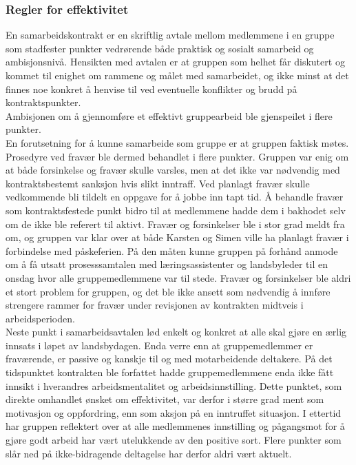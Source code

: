 \subsubsection{Regler for effektivitet}
En samarbeidskontrakt er en skriftlig avtale mellom medlemmene i en gruppe som stadfester punkter vedrørende både praktisk og sosialt samarbeid og ambisjonsnivå. 
Hensikten med avtalen er at gruppen som helhet får diskutert og kommet til enighet om rammene og målet med samarbeidet, og ikke minst at det finnes noe konkret å henvise til ved eventuelle konflikter og brudd på kontraktspunkter. 
\\
Ambisjonen om å gjennomføre et effektivt gruppearbeid ble gjenspeilet i flere punkter. 
\\
En forutsetning for å kunne samarbeide som gruppe er at gruppen faktisk møtes. 
Prosedyre ved fravær ble dermed behandlet i flere punkter. 
Gruppen var enig om at både forsinkelse og fravær skulle varsles, men at det ikke var nødvendig med kontraktsbestemt sanksjon hvis slikt inntraff. 
Ved planlagt fravær skulle vedkommende bli tildelt en oppgave for å jobbe inn tapt tid. 
Å behandle fravær som kontraktsfestede punkt bidro til at medlemmene hadde dem i bakhodet selv om de ikke ble referert til aktivt.
Fravær og forsinkelser ble i stor grad meldt fra om, og gruppen var klar over at både Karsten og Simen ville ha planlagt fravær i forbindelse med påskeferien. 
På den måten kunne gruppen på forhånd anmode om å få utsatt prosesssamtalen med læringsassistenter og landsbyleder til en onsdag hvor alle gruppemedlemmene var til stede.
Fravær og forsinkelser ble aldri et stort problem for gruppen, og det ble ikke ansett som nødvendig å innføre strengere rammer for fravær under revisjonen av kontrakten midtveis i arbeidsperioden. 
\\
Neste punkt i samarbeidsavtalen lød enkelt og konkret at alle skal gjøre en ærlig innsats i løpet av landsbydagen.
Enda verre enn at gruppemedlemmer er fraværende, er passive og kanskje til og med motarbeidende deltakere.
På det tidspunktet kontrakten ble forfattet hadde gruppemedlemmene enda ikke fått innsikt i hverandres arbeidsmentalitet og arbeidsinnstilling.
Dette punktet, som direkte omhandlet ønsket om effektivitet, var derfor i større grad ment som motivasjon og oppfordring, enn som aksjon på en inntruffet situasjon.
I ettertid har gruppen reflektert over at alle medlemmenes innstilling og pågangsmot for å gjøre godt arbeid har vært utelukkende av den positive sort.
Flere punkter som slår ned på ikke-bidragende deltagelse har derfor aldri vært aktuelt.
